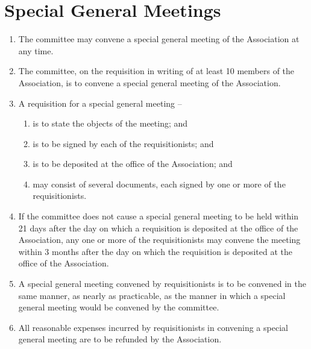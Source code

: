 \documentclass[a4paper,11pt]{article}
\begin{document}
\section{Special General Meetings}
\begin{enumerate}
	\item The committee may convene a special general meeting of the Association at any time.
	\item The committee, on the requisition in writing of at least 10 members of the Association, is to convene a special general meeting of the Association.
	
	\item A requisition for a special general meeting --
	\begin{enumerate}
		\item is to state the objects of the meeting; and
		\item is to be signed by each of the requisitionists; and
		\item is to be deposited at the office of the Association; and
		\item may consist of several documents, each signed by one or more of the requisitionists.
	\end{enumerate}
	
	\item If the committee does not cause a special general meeting to be held within 21 days after the day on which a requisition is deposited at the office of the Association, any one or more of the requisitionists may convene the meeting within 3 months after the day on which the requisition is deposited at the office of the Association.
	\item A special general meeting convened by requisitionists is to be convened in the same manner, as nearly as practicable, as the manner in which a special general meeting would be convened by the committee.
	\item All reasonable expenses incurred by requisitionists in convening a special general meeting are to be refunded by the Association.
\end{enumerate}
\end{document}
